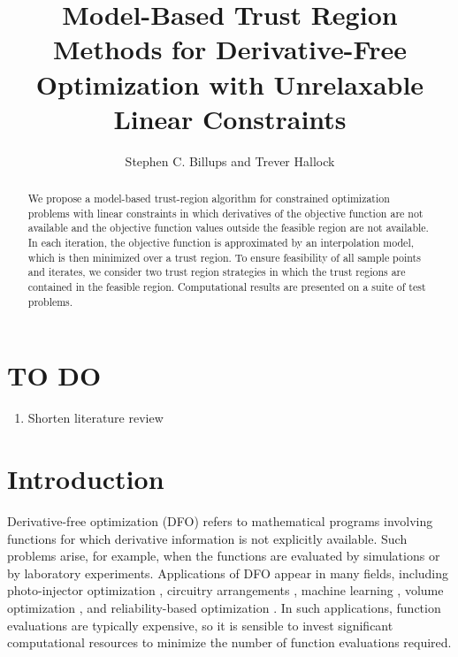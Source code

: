 \documentclass{article}
\title{Model-Based Trust Region Methods for Derivative-Free Optimization with Unrelaxable Linear Constraints}
\author{Stephen C.  Billups and Trever Hallock}
\begin{document}
\maketitle

\begin{abstract}
We propose a model-based trust-region algorithm for constrained optimization problems with linear constraints in which derivatives of the objective function are not available and the objective function values outside the feasible region are not available.
In each iteration, the objective function is approximated by an interpolation model, which is then minimized over a trust region.
To ensure feasibility of all sample points and iterates, we consider two trust region strategies in which the trust regions are contained in the feasible region.
Computational results are presented on a suite of test problems.

\end{abstract}

\newpage

\tableofcontents

\newpage
\section{TO DO}
\begin{enumerate}
\item Shorten literature review
\end{enumerate}
\section{Introduction}
Derivative-free optimization (DFO) refers to mathematical programs involving functions for which derivative information is not explicitly available.
Such problems arise, for example, when the functions are evaluated by simulations or by laboratory experiments.
Applications of DFO appear in many fields, including photo-injector optimization \cite{Neveu2017},
circuitry arrangements \cite{PLOSKAS201816}, machine learning \cite{KS2018}, volume optimization \cite{Cheng2017}, and reliability-based optimization \cite{Gao2017}.
In such applications, function evaluations are typically expensive, 
so it is sensible to invest significant computational resources to minimize the number of function evaluations required.
\end{document}
